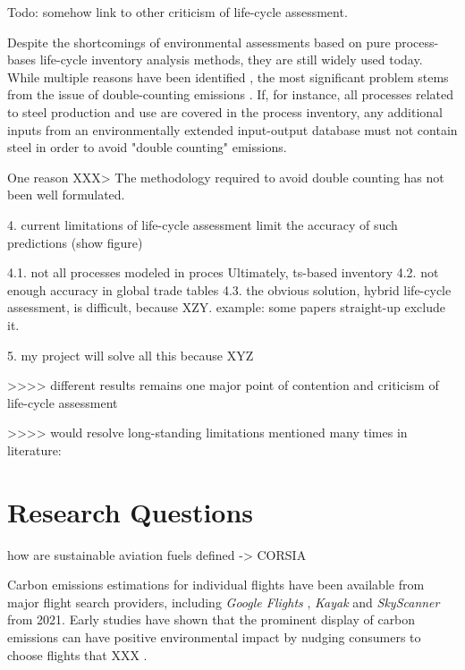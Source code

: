 \documentclass{article}
\begin{document}
    Todo: somehow link to other criticism of life-cycle assessment. 
    
    Despite the shortcomings of environmental assessments based on pure process-bases life-cycle inventory analysis methods, they are still widely used today. While multiple reasons have been identified \cite{crawford_hybrid_2018}, the most significant problem stems from the issue of double-counting emissions \cite{agez_hybridization_2020}. If, for instance, all processes related to steel production and use are covered in the process inventory, any additional inputs from an environmentally extended input-output database must not contain steel in order to avoid "double counting" emissions. 
    
    One reason XXX> The methodology required to avoid double counting has not been well formulated. 
    
    4. current limitations of life-cycle assessment limit the accuracy of such predictions (show figure)
    
        4.1. not all processes modeled in proces Ultimately, ts-based inventory
        4.2. not enough accuracy in global trade tables
        4.3. the obvious solution, hybrid life-cycle assessment, is difficult, because XZY. example: some papers straight-up exclude it.
        
    5. my project will solve all this because XYZ
    
    
    
    >>>> different results remains one major point of contention and criticism of life-cycle assessment \cite{reap_survey_2008}\cite{reap_survey_2008-1}
    
    >>>> would resolve long-standing limitations mentioned many times in literature: 





    
    
\section{Research Questions}
    
    how are sustainable aviation fuels defined -> CORSIA \cite{prussi_corsia_2021}

    Carbon emissions estimations for individual flights have been available from major flight search providers, including \textit{Google Flights} \cite{holden_google_2021}, \textit{Kayak} \cite{noauthor_kayak_2021} and \textit{SkyScanner} \cite{crosthwaite_how_2021} from 2021. Early studies have shown that the prominent display of carbon emissions can have positive environmental impact by nudging consumers to choose flights that XXX \cite{amenta_adding_2020}\cite{sanguinetti_nudging_2022}.
    
\end{document}
